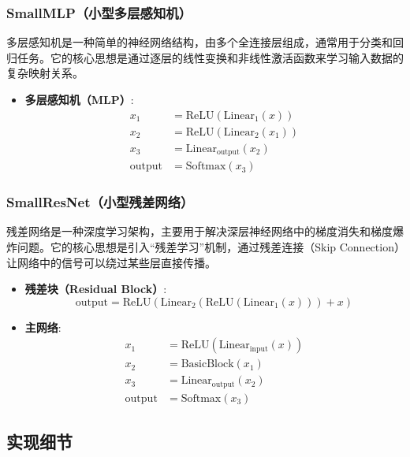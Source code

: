 \documentclass[10pt,a4paper,twoside]{article}
\numberwithin{figure}{section}%
\numberwithin{table}{section}%
\begin{document}
\subsubsection{SmallMLP（小型多层感知机）}

多层感知机是一种简单的神经网络结构，由多个全连接层组成，通常用于分类和回归任务。它的核心思想是通过逐层的线性变换和非线性激活函数来学习输入数据的复杂映射关系。

\begin{itemize}
    \item \textbf{多层感知机（MLP）}:
    $$\begin{aligned}
        x_1 &= \text{ReLU}(\text{Linear}_1(x)) \\
        x_2 &= \text{ReLU}(\text{Linear}_2(x_1)) \\
        x_3 &= \text{Linear}_{\text{output}}(x_2) \\
        \text{output} &= \text{Softmax}(x_3)
    \end{aligned}$$
\end{itemize}

\subsubsection{SmallResNet（小型残差网络）}

残差网络\cite{he2015deepresiduallearningimage}是一种深度学习架构，主要用于解决深层神经网络中的梯度消失和梯度爆炸问题。它的核心思想是引入“残差学习”机制，通过残差连接（Skip Connection）让网络中的信号可以绕过某些层直接传播。

\begin{itemize}
    \item \textbf{残差块（Residual Block）}:
    $$\text{output} = \text{ReLU}(\text{Linear}_2(\text{ReLU}(\text{Linear}_1(x))) + x)$$
    \item \textbf{主网络}:
    $$\begin{aligned}
        x_1 &= \text{ReLU}(\text{Linear}_{\text{input}}(x)) \\
        x_2 &= \text{BasicBlock}(x_1) \\
        x_3 &= \text{Linear}_{\text{output}}(x_2) \\
        \text{output} &= \text{Softmax}(x_3)
    \end{aligned}$$
\end{itemize}

\subsection{实现细节}
\end{document}
